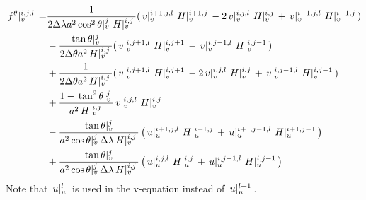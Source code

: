 \documentclass[a4paper]{article}
\begin{document}
\begin{equation}
  \begin{split}
    \dthree{f^\theta}vijl =&
    \frac1{2\Delta\lambda a^2\done{\cos^2\theta}vj\dtwo{H}vij}(\dthree{v}v{i+1}jl\dtwo{H}v{i+1}j-2\dthree{v}vijl\dtwo{H}vij+\dthree{v}v{i-1}jl\dtwo{H}v{i-1}j)\\
    &-\frac{\done{\tan\theta}vj}{2\Delta\theta a^2\dtwo{H}vij}(\dthree{v}vi{j+1}l\dtwo{H}vi{j+1}-\dthree{v}vi{j-1}l\dtwo{H}vi{j-1})\\
    &+\frac1{2\Delta\theta a^2\dtwo{H}vij}(\dthree{v}vi{j+1}l\dtwo{H}vi{j+1}-2\dthree{v}vijl\dtwo{H}vij+\dthree{v}vi{j-1}l\dtwo{H}vi{j-1})\\
    &+\frac{1-\done{\tan^2\theta}vj}{a^2\dtwo{H}vij}\dthree{v}vijl\dtwo{H}vij\\
    &-\frac{\done{\tan\theta}vj}{a^2\done{\cos\theta}vj\Delta\lambda\dtwo{H}vij}\left(\dthree{u}u{i+1}jl\dtwo{H}u{i+1}j+\dthree{u}u{i+1}{j-1}l\dtwo{H}u{i+1}{j-1}\right)\\
    &+\frac{\done{\tan\theta}vj}{a^2\done{\cos\theta}vj\Delta\lambda\dtwo{H}vij}\left(\dthree{u}uijl\dtwo{H}uij+\dthree{u}ui{j-1}l\dtwo{H}ui{j-1}\right)
  \end{split}
\end{equation}
Note that $\done{u}ul$ is used in the v-equation instead of $\done{u}u{l+1}$.
\end{document}
